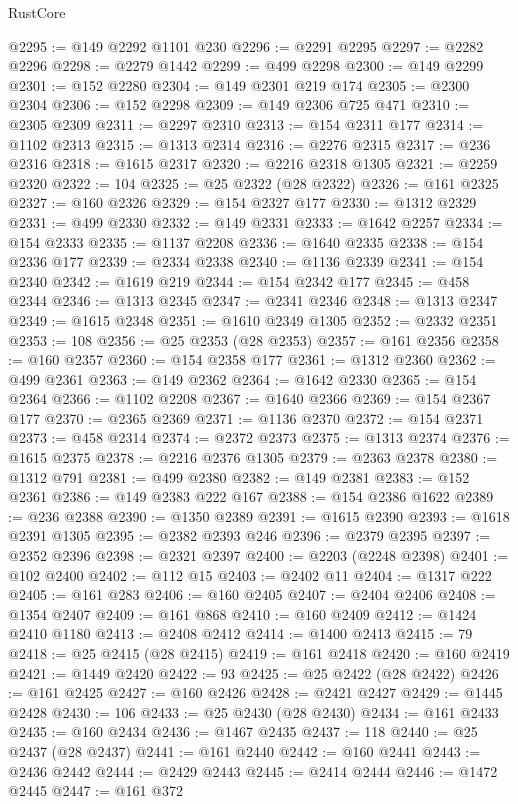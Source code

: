 \begin{lexlean}{RustCore}
\begin{coremodule}
@2295 := @149 @2292 @1101 @230
@2296 := @2291 @2295
@2297 := @2282 @2296
@2298 := @2279 @1442
@2299 := @499 @2298
@2300 := @149 @2299
@2301 := @152 @2280
@2304 := @149 @2301 @219 @174
@2305 := @2300 @2304
@2306 := @152 @2298
@2309 := @149 @2306 @725 @471
@2310 := @2305 @2309
@2311 := @2297 @2310
@2313 := @154 @2311 @177
@2314 := @1102 @2313
@2315 := @1313 @2314
@2316 := @2276 @2315
@2317 := @236 @2316
@2318 := @1615 @2317
@2320 := @2216 @2318 @1305
@2321 := @2259 @2320
@2322 := 104
@2325 := @25 @2322 (@28 @2322)
@2326 := @161 @2325
@2327 := @160 @2326
@2329 := @154 @2327 @177
@2330 := @1312 @2329
@2331 := @499 @2330
@2332 := @149 @2331
@2333 := @1642 @2257
@2334 := @154 @2333
@2335 := @1137 @2208
@2336 := @1640 @2335
@2338 := @154 @2336 @177
@2339 := @2334 @2338
@2340 := @1136 @2339
@2341 := @154 @2340
@2342 := @1619 @219
@2344 := @154 @2342 @177
@2345 := @458 @2344
@2346 := @1313 @2345
@2347 := @2341 @2346
@2348 := @1313 @2347
@2349 := @1615 @2348
@2351 := @1610 @2349 @1305
@2352 := @2332 @2351
@2353 := 108
@2356 := @25 @2353 (@28 @2353)
@2357 := @161 @2356
@2358 := @160 @2357
@2360 := @154 @2358 @177
@2361 := @1312 @2360
@2362 := @499 @2361
@2363 := @149 @2362
@2364 := @1642 @2330
@2365 := @154 @2364
@2366 := @1102 @2208
@2367 := @1640 @2366
@2369 := @154 @2367 @177
@2370 := @2365 @2369
@2371 := @1136 @2370
@2372 := @154 @2371
@2373 := @458 @2314
@2374 := @2372 @2373
@2375 := @1313 @2374
@2376 := @1615 @2375
@2378 := @2216 @2376 @1305
@2379 := @2363 @2378
@2380 := @1312 @791
@2381 := @499 @2380
@2382 := @149 @2381
@2383 := @152 @2361
@2386 := @149 @2383 @222 @167
@2388 := @154 @2386 @1622
@2389 := @236 @2388
@2390 := @1350 @2389
@2391 := @1615 @2390
@2393 := @1618 @2391 @1305
@2395 := @2382 @2393 @246
@2396 := @2379 @2395
@2397 := @2352 @2396
@2398 := @2321 @2397
@2400 := @2203 (@2248 @2398)
@2401 := @102 @2400
@2402 := @112 @15
@2403 := @2402 @11
@2404 := @1317 @222
@2405 := @161 @283
@2406 := @160 @2405
@2407 := @2404 @2406
@2408 := @1354 @2407
@2409 := @161 @868
@2410 := @160 @2409
@2412 := @1424 @2410 @1180
@2413 := @2408 @2412
@2414 := @1400 @2413
@2415 := 79
@2418 := @25 @2415 (@28 @2415)
@2419 := @161 @2418
@2420 := @160 @2419
@2421 := @1449 @2420
@2422 := 93
@2425 := @25 @2422 (@28 @2422)
@2426 := @161 @2425
@2427 := @160 @2426
@2428 := @2421 @2427
@2429 := @1445 @2428
@2430 := 106
@2433 := @25 @2430 (@28 @2430)
@2434 := @161 @2433
@2435 := @160 @2434
@2436 := @1467 @2435
@2437 := 118
@2440 := @25 @2437 (@28 @2437)
@2441 := @161 @2440
@2442 := @160 @2441
@2443 := @2436 @2442
@2444 := @2429 @2443
@2445 := @2414 @2444
@2446 := @1472 @2445
@2447 := @161 @372

\end{coremodule}
\end{lexlean}

